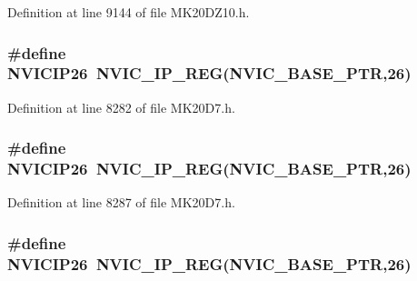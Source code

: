 Definition at line 9144 of file M\+K20\+D\+Z10.\+h.

\subsubsection[{\texorpdfstring{N\+V\+I\+C\+I\+P26}{NVICIP26}}]{\setlength{\rightskip}{0pt plus 5cm}\#define N\+V\+I\+C\+I\+P26~{\bf N\+V\+I\+C\+\_\+\+I\+P\+\_\+\+R\+EG}({\bf N\+V\+I\+C\+\_\+\+B\+A\+S\+E\+\_\+\+P\+TR},26)}\hypertarget{group___n_v_i_c___register___accessor___macros_gae30bce375b665bc126b2155a4d415209}{}\label{group___n_v_i_c___register___accessor___macros_gae30bce375b665bc126b2155a4d415209}


Definition at line 8282 of file M\+K20\+D7.\+h.

\subsubsection[{\texorpdfstring{N\+V\+I\+C\+I\+P26}{NVICIP26}}]{\setlength{\rightskip}{0pt plus 5cm}\#define N\+V\+I\+C\+I\+P26~{\bf N\+V\+I\+C\+\_\+\+I\+P\+\_\+\+R\+EG}({\bf N\+V\+I\+C\+\_\+\+B\+A\+S\+E\+\_\+\+P\+TR},26)}\hypertarget{group___n_v_i_c___register___accessor___macros_gae30bce375b665bc126b2155a4d415209}{}\label{group___n_v_i_c___register___accessor___macros_gae30bce375b665bc126b2155a4d415209}


Definition at line 8287 of file M\+K20\+D7.\+h.

\subsubsection[{\texorpdfstring{N\+V\+I\+C\+I\+P26}{NVICIP26}}]{\setlength{\rightskip}{0pt plus 5cm}\#define N\+V\+I\+C\+I\+P26~{\bf N\+V\+I\+C\+\_\+\+I\+P\+\_\+\+R\+EG}({\bf N\+V\+I\+C\+\_\+\+B\+A\+S\+E\+\_\+\+P\+TR},26)}\hypertarget{group___n_v_i_c___register___accessor___macros_gae30bce375b665bc126b2155a4d415209}{}\label{group___n_v_i_c___register___accessor___macros_gae30bce375b665bc126b2155a4d415209}


